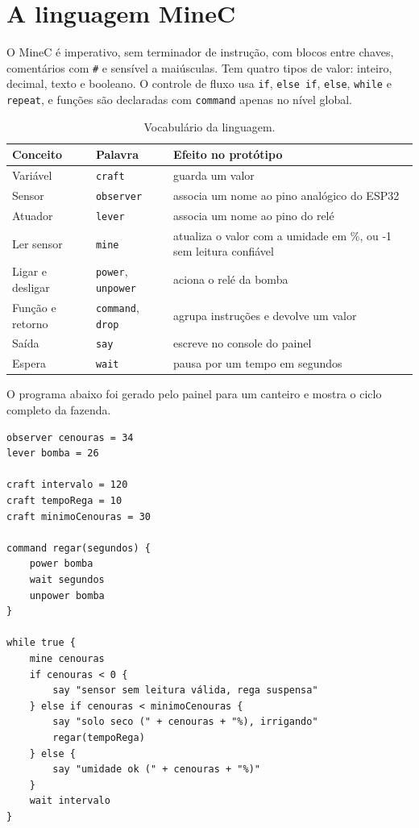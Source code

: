 \documentclass[11pt,a4paper]{article}
\newcommand{\cod}[1]{\texttt{#1}}
\begin{document}
\section{A linguagem MineC}\label{sec:linguagem}

O MineC é imperativo, sem terminador de instrução, com blocos entre chaves, comentários com \cod{\#} e sensível a maiúsculas. Tem quatro tipos de valor: inteiro, decimal, texto e booleano. O controle de fluxo usa \cod{if}, \cod{else if}, \cod{else}, \cod{while} e \cod{repeat}, e funções são declaradas com \cod{command} apenas no nível global.

\begin{table}[htbp]
\centering
\caption{Vocabulário da linguagem.}
\label{tab:vocabulario}
\begin{tabularx}{\textwidth}{>{\raggedright\arraybackslash}p{3.2cm} >{\raggedright\arraybackslash}p{3.2cm} Y}
\toprule
\textbf{Conceito} & \textbf{Palavra} & \textbf{Efeito no protótipo} \\
\midrule
Variável & \cod{craft} & guarda um valor \\
Sensor & \cod{observer} & associa um nome ao pino analógico do ESP32 \\
Atuador & \cod{lever} & associa um nome ao pino do relé \\
Ler sensor & \cod{mine} & atualiza o valor com a umidade em \%, ou -1 sem leitura confiável \\
Ligar e desligar & \cod{power}, \cod{unpower} & aciona o relé da bomba \\
Função e retorno & \cod{command}, \cod{drop} & agrupa instruções e devolve um valor \\
Saída & \cod{say} & escreve no console do painel \\
Espera & \cod{wait} & pausa por um tempo em segundos \\
\bottomrule
\end{tabularx}
\end{table}

O programa abaixo foi gerado pelo painel para um canteiro e mostra o ciclo completo da fazenda.

\begin{lstlisting}[language=MineC,keywordstyle=\color{palavra}\bfseries,stringstyle=\color{texto},commentstyle=\color{comentario},caption={Programa gerado pelo painel para um canteiro.},label={lst:programa}]
observer cenouras = 34
lever bomba = 26

craft intervalo = 120
craft tempoRega = 10
craft minimoCenouras = 30

command regar(segundos) {
    power bomba
    wait segundos
    unpower bomba
}

while true {
    mine cenouras
    if cenouras < 0 {
        say "sensor sem leitura válida, rega suspensa"
    } else if cenouras < minimoCenouras {
        say "solo seco (" + cenouras + "%), irrigando"
        regar(tempoRega)
    } else {
        say "umidade ok (" + cenouras + "%)"
    }
    wait intervalo
}
\end{lstlisting}
\end{document}
